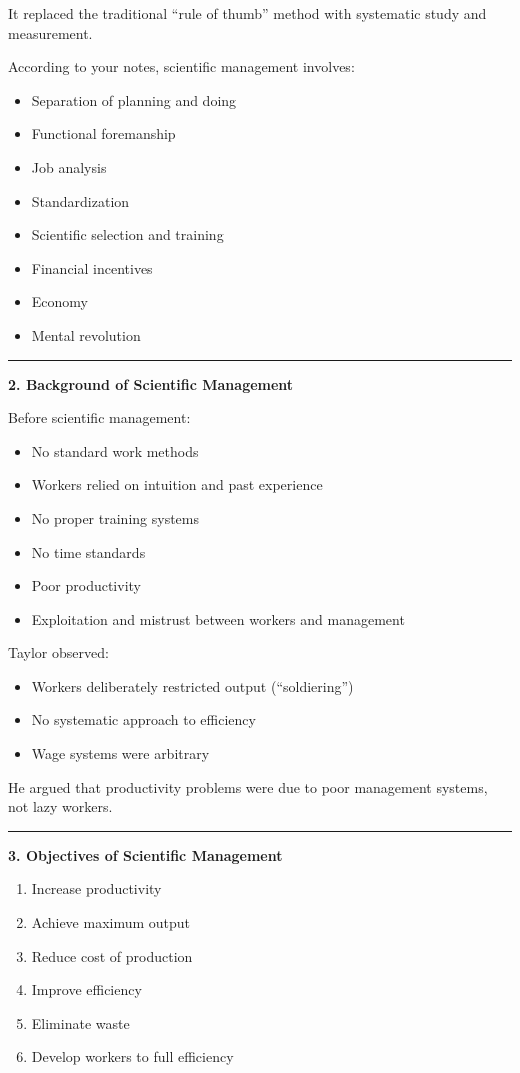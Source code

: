 \documentclass[10pt,a4paper]{article}
\newcommand{\separator}{\vspace{0.4em}\noindent\rule{\linewidth}{0.6pt}\vspace{0.4em}}
\begin{document}
It replaced the traditional ``rule of thumb'' method with systematic study and measurement.

According to your notes, scientific management involves:

\begin{itemize}
  \item Separation of planning and doing
  \item Functional foremanship
  \item Job analysis
  \item Standardization
  \item Scientific selection and training
  \item Financial incentives
  \item Economy
  \item Mental revolution
\end{itemize}

\separator

\textbf{2. Background of Scientific Management}

Before scientific management:

\begin{itemize}
  \item No standard work methods
  \item Workers relied on intuition and past experience
  \item No proper training systems
  \item No time standards
  \item Poor productivity
  \item Exploitation and mistrust between workers and management
\end{itemize}

Taylor observed:

\begin{itemize}
  \item Workers deliberately restricted output (``soldiering'')
  \item No systematic approach to efficiency
  \item Wage systems were arbitrary
\end{itemize}

He argued that productivity problems were due to poor management systems, not lazy
workers.

\separator

\textbf{3. Objectives of Scientific Management}

\begin{enumerate}
  \item Increase productivity
  \item Achieve maximum output
  \item Reduce cost of production
  \item Improve efficiency
  \item Eliminate waste
  \item Develop workers to full efficiency
\end{enumerate}
\end{document}
